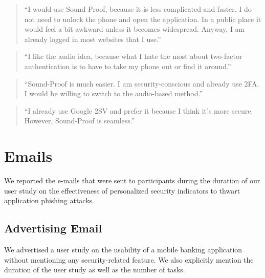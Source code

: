\begin{quote}
``I would use Sound-Proof, because it is less complicated and faster.
I do not need to unlock the phone and open the application.
In a public place it would feel a bit awkward unless it becomes widespread.
Anyway, I am already logged in most websites that I use.''
\end{quote}

\begin{quote}
``I like the audio idea, because what I hate the most about two-factor authentication is to have to take my phone out or find it around.''
\end{quote}

\begin{quote}
``Sound-Proof is much easier. I am security-conscious and already use 2FA. I would be willing to switch to the audio-based method.''
\end{quote}

\begin{quote}
``I already use Google 2SV and prefer it because I think it's more secure. However, Sound-Proof is seamless.''
\end{quote}

\section{Emails}
\label{app:sp_phishing_emails}

We reported the e-mails that were sent to participants during the duration of our user study on the effectiveness of personalized security indicators to thwart application phishing attacks.

\subsection{Advertising Email}
\label{app:sp_phishing_advertising}
We advertised a user study on the usability of a mobile banking application without mentioning any security-related feature. We also explicitly mention the duration of the user study as well as the number of tasks.


